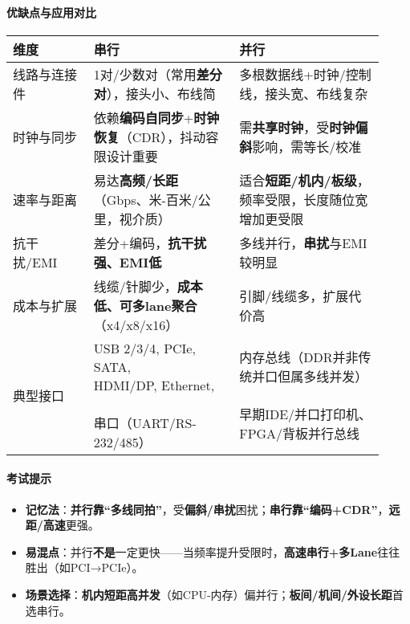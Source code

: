 \documentclass[lang=cn,newtx,10pt,scheme=chinese]{../../elegantbook}
\begin{document}
\paragraph{优缺点与应用对比}
{\small\begin{longtable}{|p{0.20\linewidth}|p{0.36\linewidth}|p{0.36\linewidth}|}
\hline
    	\textbf{维度} & \textbf{串行} & \textbf{并行} \\
\hline
线路与连接件 & 1对/少数对（常用\textbf{差分对}），接头小、布线简 & 多根数据线+时钟/控制线，接头宽、布线复杂 \\
\hline
时钟与同步 & 依赖\textbf{编码自同步}+\textbf{时钟恢复}（CDR），抖动容限设计重要 & 需\textbf{共享时钟}，受\textbf{时钟偏斜}影响，需等长/校准 \\
\hline
速率与距离 & 易达\textbf{高频/长距}（Gbps、米-百米/公里，视介质） & 适合\textbf{短距/机内/板级}，频率受限，长度随位宽增加更受限 \\
\hline
抗干扰/EMI & 差分+编码，\textbf{抗干扰强、EMI低} & 多线并行，\textbf{串扰}与EMI较明显 \\
\hline
成本与扩展 & 线缆/针脚少，\textbf{成本低、可多lane聚合}（x4/x8/x16） & 引脚/线缆多，扩展代价高 \\
\hline
典型接口 & \makecell[l]{USB 2/3/4, PCIe, SATA, \newline HDMI/DP, Ethernet,\newline \\串口（UART/RS-232/485）} 
& \makecell[l]{内存总线（DDR并非传统并口但属多线并发）
\newline \\早期IDE/并口打印机、\newline FPGA/背板并行总线} \\
\hline
\end{longtable}}

\paragraph{考试提示}
\begin{itemize}
    \item \textbf{记忆法}：\textbf{并行靠“多线同拍”}，受\textbf{偏斜/串扰}困扰；\textbf{串行靠“编码+CDR”}，\textbf{远距/高速}更强。
    \item \textbf{易混点}：并行\textbf{不是}一定更快——当频率提升受限时，\textbf{高速串行+多Lane}往往胜出（如PCI→PCIe）。
    \item \textbf{场景选择}：\textbf{机内短距高并发}（如CPU-内存）偏并行；\textbf{板间/机间/外设长距}首选串行。
\end{itemize}
\end{document}
